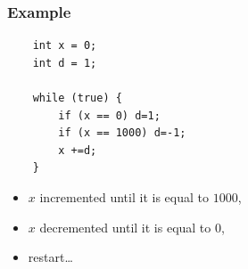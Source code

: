 \documentclass{beamer}
\begin{document}
\begin{frame}[containsverbatim]
	\frametitle{Example}
\begin{center}
\begin{lstlisting}
	int x = 0;
	int d = 1;
	
	while (true) {
		if (x == 0) d=1;
		if (x == 1000) d=-1;
		x +=d;
	}
\end{lstlisting}
\end{center}
\begin{itemize}
\item $x$ incremented until it is equal to $1000$,
\item $x$ decremented until it is equal to $0$,
\item restart\ldots
\end{itemize}

\end{frame}
\end{document}

